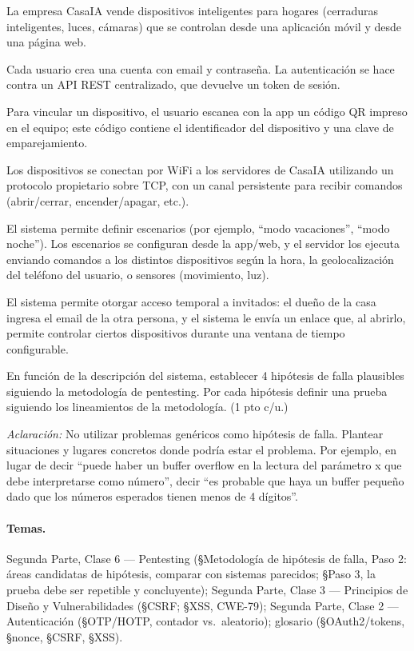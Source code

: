 \begin{consigna}
La empresa CasaIA vende dispositivos inteligentes para hogares (cerraduras
inteligentes, luces, cámaras) que se controlan desde una aplicación móvil y desde
una página web.

Cada usuario crea una cuenta con email y contraseña. La autenticación se hace
contra un API REST centralizado, que devuelve un token de sesión.

Para vincular un dispositivo, el usuario escanea con la app un código QR impreso
en el equipo; este código contiene el identificador del dispositivo y una clave
de emparejamiento.

Los dispositivos se conectan por WiFi a los servidores de CasaIA utilizando un
protocolo propietario sobre TCP, con un canal persistente para recibir comandos
(abrir/cerrar, encender/apagar, etc.).

El sistema permite definir escenarios (por ejemplo, ``modo vacaciones'', ``modo
noche''). Los escenarios se configuran desde la app/web, y el servidor los ejecuta
enviando comandos a los distintos dispositivos según la hora, la geolocalización
del teléfono del usuario, o sensores (movimiento, luz).

El sistema permite otorgar acceso temporal a invitados: el dueño de la casa
ingresa el email de la otra persona, y el sistema le envía un enlace que, al
abrirlo, permite controlar ciertos dispositivos durante una ventana de tiempo
configurable.

En función de la descripción del sistema, establecer 4 hipótesis de falla
plausibles siguiendo la metodología de pentesting. Por cada hipótesis definir una
prueba siguiendo los lineamientos de la metodología. (1 pto c/u.)

\emph{Aclaración:} No utilizar problemas genéricos como hipótesis de falla.
Plantear situaciones y lugares concretos donde podría estar el problema. Por
ejemplo, en lugar de decir ``puede haber un buffer overflow en la lectura del
parámetro x que debe interpretarse como número'', decir ``es probable que haya un
buffer pequeño dado que los números esperados tienen menos de 4 dígitos''.
\end{consigna}

\paragraph{Temas.}
Segunda Parte, Clase 6 --- Pentesting (\S Metodología de hipótesis de falla, Paso 2:
áreas candidatas de hipótesis, comparar con sistemas parecidos; \S Paso 3, la
prueba debe ser repetible y concluyente); Segunda Parte, Clase 3 --- Principios de
Diseño y Vulnerabilidades (\S CSRF; \S XSS, CWE-79); Segunda Parte, Clase 2 ---
Autenticación (\S OTP/HOTP, contador vs.\ aleatorio); glosario (\S OAuth2/tokens,
\S nonce, \S CSRF, \S XSS).


